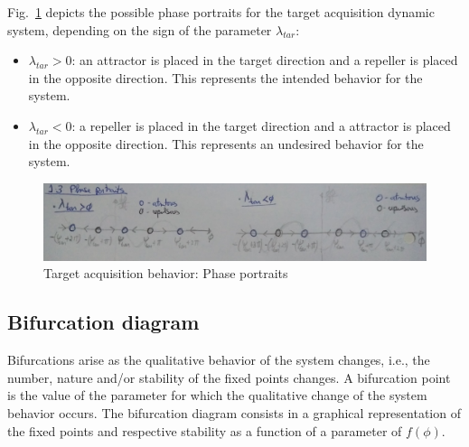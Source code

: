 Fig.~\ref{fig:1-3-phase-portraits} depicts the possible phase portraits for the
target acquisition dynamic system, depending on the sign of the parameter
$\lambda_{tar}$:
\begin{itemize}
\item $\lambda_{tar} > 0$: an attractor is placed in the target direction and a
  repeller is placed in the opposite direction. This represents the intended
  behavior for the system.
\item $\lambda_{tar} < 0$: a repeller is placed in the target direction and a
  attractor is placed in the opposite direction. This represents an undesired
  behavior for the system.
\end{itemize}
%
\begin{figure}[!hbt]
\centering
    \includegraphics[width=1.0\textwidth]{./img/1-3-phase-portraits.jpg}
  \caption{Target acquisition behavior: Phase portraits}%
\label{fig:1-3-phase-portraits}
\end{figure}
%
\subsection{Bifurcation diagram}%
\label{sec:bifurcation-diagram}
Bifurcations arise as the qualitative behavior of the system changes, i.e., the
number, nature and/or stability of the fixed points changes. A bifurcation point
is the value of the parameter for which the qualitative change of the system
behavior occurs. The bifurcation diagram consists in a graphical representation
of the fixed points and respective stability as a function of a parameter of
$f(\phi)$.

